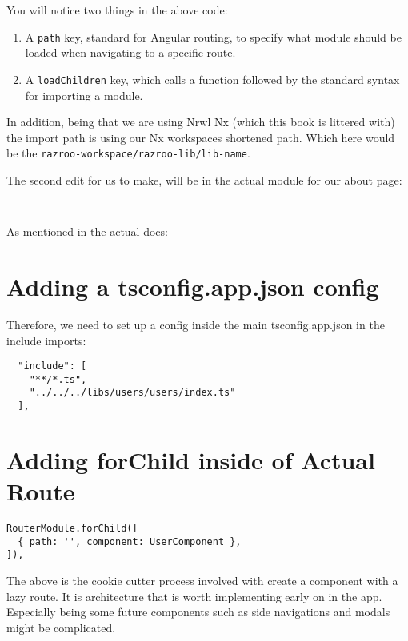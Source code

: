 You will notice two things in the above code: 
\begin{enumerate}
  \item A \lstinline{path} key, standard for Angular routing, to specify what 
  module should be loaded when navigating to a specific route. 
  \item A \lstinline{loadChildren} key, which calls a function followed by the 
  standard syntax for importing a module. 
\end{enumerate}

In addition, being that we are using Nrwl Nx (which this book is littered with)
the import path is using our Nx workspaces shortened path. Which here would be the 
\lstinline{razroo-workspace/razroo-lib/lib-name}.

The second edit for us to make, will be in the actual module for our about page: 
\begin{lstlisting}
  
\end{lstlisting}

As mentioned in the actual docs:

\section{Adding a tsconfig.app.json config}
Therefore, we need to set up a config inside the main tsconfig.app.json in the
include imports:
\begin{verbatim}
  "include": [
    "**/*.ts",
    "../../../libs/users/users/index.ts"
  ],
\end{verbatim}

\section{Adding forChild inside of Actual Route}
\begin{lstlisting}
RouterModule.forChild([
  { path: '', component: UserComponent },
]),
\end{lstlisting}

The above is the cookie cutter process involved with create a component with a
lazy route. It is architecture that is worth implementing early on in the app.
Especially being some future components such as side navigations and modals
might be complicated.
